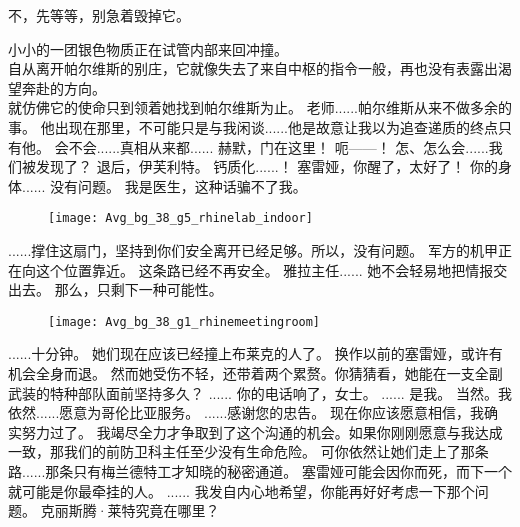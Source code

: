 \documentclass[openany]{book}
\begin{document}
\begin{dialogue}
     不，先等等，别急着毁掉它。\par
    小小的一团银色物质正在试管内部来回冲撞。\\
    自从离开帕尔维斯的别庄，它就像失去了来自中枢的指令一般，再也没有表露出渴望奔赴的方向。\\
    就仿佛它的使命只到领着她找到帕尔维斯为止。
     老师......帕尔维斯从来不做多余的事。
     他出现在那里，不可能只是与我闲谈......他是故意让我以为追查递质的终点只有他。
     会不会......真相从来都......
     赫默，门在这里！
     呃——！
     怎、怎么会......我们被发现了？
     退后，伊芙利特。
     钙质化......！
     塞雷娅，你醒了，太好了！
     你的身体......
     没有问题。
     我是医生，这种话骗不了我。
    \begin{figure}[h]
        \centering
        \texttt{[image: Avg\_bg\_38\_g5\_rhinelab\_indoor]}
    \end{figure}
     ......撑住这扇门，坚持到你们安全离开已经足够。所以，没有问题。
     军方的机甲正在向这个位置靠近。
     这条路已经不再安全。
     雅拉主任......
     她不会轻易地把情报交出去。
     那么，只剩下一种可能性。
\end{dialogue}

\begin{figure}[h]
    \centering
    \texttt{[image: Avg\_bg\_38\_g1\_rhinemeetingroom]}
\end{figure}
\begin{dialogue}
     ......十分钟。
     她们现在应该已经撞上布莱克的人了。
     换作以前的塞雷娅，或许有机会全身而退。
     然而她受伤不轻，还带着两个累赘。你猜猜看，她能在一支全副武装的特种部队面前坚持多久？
     ......
     你的电话响了，女士。
     ......
     是我。
     当然。我依然......愿意为哥伦比亚服务。
     ......感谢您的忠告。
     现在你应该愿意相信，我确实努力过了。
     我竭尽全力才争取到了这个沟通的机会。如果你刚刚愿意与我达成一致，那我们的前防卫科主任至少没有生命危险。
     可你依然让她们走上了那条路......那条只有梅兰德特工才知晓的秘密通道。
     塞雷娅可能会因你而死，而下一个就可能是你最牵挂的人。
     ......
     我发自内心地希望，你能再好好考虑一下那个问题。
     克丽斯腾·莱特究竟在哪里？
\end{dialogue}
\end{document}
